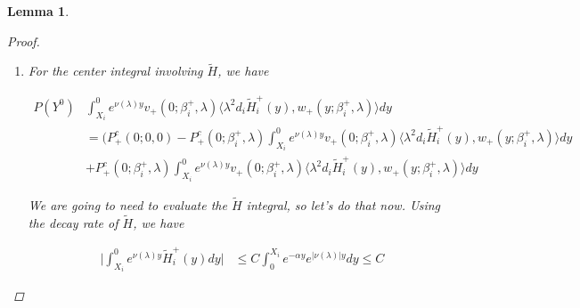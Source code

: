 \documentclass[12pt]{article}
\newtheorem{lemma}{Lemma}
\begin{document}
\begin{lemma}
\begin{proof}
\begin{enumerate}
The second one has bound

\begin{align*}
\int_0^{X_i} &e^{-\alpha X_i} e^{-\alpha (X_i - y)} e^{-\tilde{\alpha}(X_i - y)}|D||d|  dy \leq |D| |d| e^{-\alpha X_m } \int_0^{X_i} e^{-(\alpha + \tilde{\alpha})(X_i - y) } dy \\
&\leq C e^{-\alpha X_m } |D||d|
\end{align*}

The last one has bound

\begin{align*}
( e^{-\alpha X_m}( |c^-| + |D| ) + |\lambda|^2) |d| &\int_0^{X_i} e^{-\alpha X_i} e^{-\alpha (X_i - y)} dy \leq C e^{-\alpha X_m } ( e^{-\alpha X_m}( |c^-| + |D| ) + |\lambda|^2) |d|
\end{align*}

All together, the bound is

\begin{align*}
\Big| P(Y^0) &\int_{X_i}^0 e^{\nu(\lambda)y} v_+(0; \beta_i^+, \lambda) \langle G_i^+(y)W_i^+(y), w_+(y; \beta_i^+, \lambda) \rangle dy \Big| \\
&\leq C e^{-\alpha X_m} ( |c^-| + (|\lambda|^2 + |D|) |d| )
\end{align*}

\item For the center integral involving $\tilde{H}$, we have

\begin{align*}
P(Y^0) &\int_{X_i}^0 e^{\nu(\lambda)y} v_+(0; \beta_i^+, \lambda) \langle \lambda^2 d_i \tilde{H}_i^+(y), w_+(y; \beta_i^+, \lambda) \rangle dy \\
&= ( P^c_+(0; 0, 0) - P^c_+(0; \beta_i^+, \lambda) \int_{X_i}^0 e^{\nu(\lambda)y} v_+(0; \beta_i^+, \lambda) \langle \lambda^2 d_i \tilde{H}_i^+(y), w_+(y; \beta_i^+, \lambda) \rangle dy \\
&+ P^c_+(0; \beta_i^+, \lambda) \int_{X_i}^0 e^{\nu(\lambda)y} v_+(0; \beta_i^+, \lambda) \langle \lambda^2 d_i \tilde{H}_i^+(y), w_+(y; \beta_i^+, \lambda) \rangle dy 
\end{align*}

We are going to need to evaluate the $\tilde{H}$ integral, so let's do that now. Using the decay rate of $\tilde{H}$, we have

\begin{align*}
\Big| \int_{X_i}^0 e^{\nu(\lambda)y} \tilde{H}_i^+(y) dy \Big| 
&\leq C \int_0^{X_i} e^{-\alpha y} e^{|\nu(\lambda)| y} dy \leq C
\end{align*}


\end{enumerate}
\end{proof}
\end{lemma}
\end{document}
